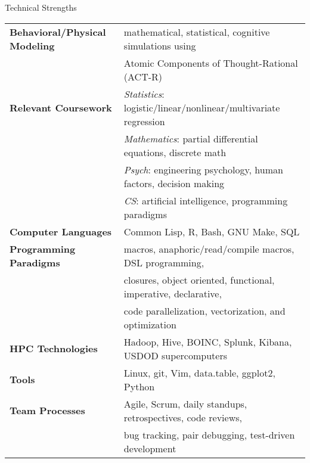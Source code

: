 

\begin{rSection}{Technical Strengths}
  \begin{tabular}{ @{} >{\bfseries}l @{\hspace{4ex}} l }
    Behavioral/Physical Modeling &	mathematical, statistical, cognitive simulations using \\
    &					Atomic Components of Thought-Rational (ACT-R) \\
    [.13cm]
    Relevant Coursework &		\emph{Statistics}: logistic/linear/nonlinear/multivariate regression \\
    &					\emph{Mathematics}: partial differential equations, discrete math \\
    &					\emph{Psych}: engineering psychology, human factors, decision making \\ 
    &					\emph{CS}: artificial intelligence, programming paradigms \\
    [.13cm]
    Computer Languages &		Common Lisp, R, Bash, GNU Make, SQL \\
    [.13cm]
    Programming Paradigms &		macros, anaphoric/read/compile macros, DSL programming, \\
    & 					closures, object oriented, functional, imperative, declarative, \\
    &					code parallelization, vectorization, and optimization \\
    [.13cm]
    HPC Technologies &			Hadoop, Hive, BOINC, Splunk, Kibana, USDOD supercomputers \\
    [.13cm]
    Tools & 				Linux, git, Vim, data.table, ggplot2, Python \\
    [.13cm]
    Team Processes & 			Agile, Scrum, daily standups, retrospectives, code reviews, \\
    & 					bug tracking, pair debugging, test-driven development \\
  \end{tabular}
\end{rSection}

